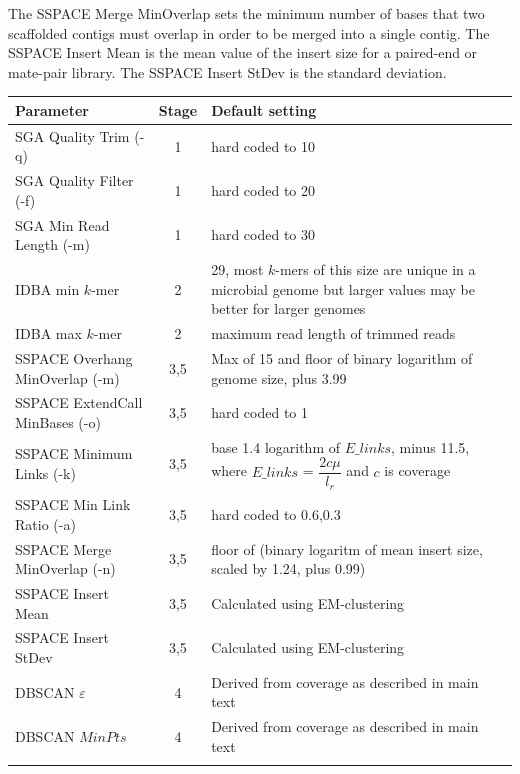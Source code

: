 \documentclass{bioinfo}
\begin{document}
The SSPACE Merge MinOverlap sets the minimum number of bases that two scaffolded contigs must overlap in order to be merged
into a single contig.  The SSPACE Insert Mean is the mean value of the insert size for a paired-end or mate-pair library. 
The SSPACE Insert StDev is the standard deviation.


\begin{table}[!t]
{\begin{tabular}{l|c|l}\toprule
Parameter                       & Stage & Default setting  \\\midrule
SGA Quality Trim (-q)           & 1     & hard coded to 10 \\
SGA Quality Filter (-f)         & 1     & hard coded to 20  \\
SGA Min Read Length (-m)        & 1     & hard coded to 30 \\
IDBA min $k$-mer                & 2     & 29, most $k$-mers of this size are unique in a microbial genome but larger values may be better for larger genomes \\
IDBA max $k$-mer                & 2     & maximum read length of trimmed reads \\
SSPACE Overhang MinOverlap (-m) & 3,5   & Max of 15 and floor of binary logarithm of genome size, plus 3.99  \\
SSPACE ExtendCall MinBases (-o) & 3,5   & hard coded to 1 \\
SSPACE Minimum Links (-k)       & 3,5   & base 1.4 logarithm of $E\_links$, minus 11.5, where $E\_links$ = $\dfrac{2c\mu}{l_r}$ and $c$ is coverage \\
SSPACE Min Link Ratio (-a)      & 3,5   & hard coded to 0.6,0.3  \\
SSPACE Merge MinOverlap (-n)    & 3,5   & floor of (binary logaritm of mean insert size, scaled by 1.24, plus 0.99) \\
SSPACE Insert Mean 	            & 3,5   & Calculated using EM-clustering \\
SSPACE Insert StDev             & 3,5   & Calculated using EM-clustering \\
DBSCAN $\varepsilon$            & 4     & Derived from coverage as described in main text \\
DBSCAN $MinPts$                 & 4     & Derived from coverage as described in main text \\
\botrule \\
\end{tabular}}{}
\end{table}
\end{document}
